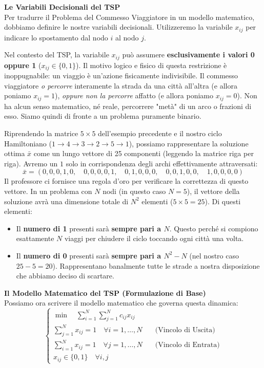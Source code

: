 \documentclass[12pt, a4paper]{article}
\begin{document}
	\vspace{0.4cm}
	\textbf{Le Variabili Decisionali del TSP}\\
	Per tradurre il Problema del Commesso Viaggiatore in un modello matematico, dobbiamo definire le nostre variabili decisionali. Utilizzeremo la variabile $x_{ij}$ per indicare lo spostamento dal nodo $i$ al nodo $j$.
	
	Nel contesto del TSP, la variabile $x_{ij}$ può assumere \textbf{esclusivamente i valori 0 oppure 1} ($x_{ij} \in \{0, 1\}$).
	Il motivo logico e fisico di questa restrizione è inoppugnabile: un viaggio è un'azione fisicamente indivisibile. Il commesso viaggiatore \textit{o percorre} interamente la strada da una città all'altra (e allora poniamo $x_{ij} = 1$), \textit{oppure non la percorre} affatto (e allora poniamo $x_{ij} = 0$). Non ha alcun senso matematico, né reale, percorrere "metà" di un arco o frazioni di esso. Siamo quindi di fronte a un problema puramente binario.
	
	Riprendendo la matrice $5 \times 5$ dell'esempio precedente e il nostro ciclo Hamiltoniano ($1 \rightarrow 4 \rightarrow 3 \rightarrow 2 \rightarrow 5 \rightarrow 1$), possiamo rappresentare la soluzione ottima $\bar{x}$ come un lungo vettore di 25 componenti (leggendo la matrice riga per riga). 
	Avremo un $1$ solo in corrispondenza degli archi effettivamente attraversati:
	\[
	\bar{x} = (0,0,0,1,0, \quad 0,0,0,0,1, \quad 0,1,0,0,0, \quad 0,0,1,0,0, \quad 1,0,0,0,0)
	\]
	Il professore ci fornisce una regola d'oro per verificare la correttezza di questo vettore. In un problema con $N$ nodi (in questo caso $N=5$), il vettore della soluzione avrà una dimensione totale di $N^2$ elementi ($5 \times 5 = 25$). Di questi elementi:
	\begin{itemize}[label=\textcolor{titlecolor}{\Large\textbullet}, itemsep=2pt, leftmargin=1.5cm]
		\item Il \textbf{numero di 1} presenti sarà \textbf{sempre pari a $N$}. Questo perché si compiono esattamente $N$ viaggi per chiudere il ciclo toccando ogni città una volta.
		\item Il \textbf{numero di 0} presenti sarà \textbf{sempre pari a $N^2 - N$} (nel nostro caso $25 - 5 = 20$). Rappresentano banalmente tutte le strade a nostra disposizione che abbiamo deciso di scartare.
	\end{itemize}
	
	\vspace{0.4cm}
	\textbf{Il Modello Matematico del TSP (Formulazione di Base)}\\
	Possiamo ora scrivere il modello matematico che governa questa dinamica:
	\[
	\begin{cases}
		\min \quad \sum_{i=1}^N \sum_{j=1}^N c_{ij} x_{ij} \\[10pt]
		\sum_{j=1}^N x_{ij} = 1 \quad \forall i = 1, \dots, N \quad &\text{(Vincolo di Uscita)} \\[10pt]
		\sum_{i=1}^N x_{ij} = 1 \quad \forall j = 1, \dots, N \quad &\text{(Vincolo di Entrata)} \\[10pt]
		x_{ij} \in \{0, 1\} \quad \forall i,j
	\end{cases}
	\]
	
\end{document}
